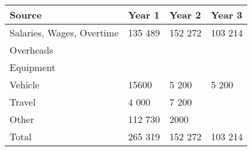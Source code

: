 \documentclass[version=last,
    paper=a4,                               %
    10pt,                                   %
    dvipsnames,
    oneside,                              %
    headings=openany,                       %
    open=any,
    BCOR=7mm,                               %
    DIV=15,     %
]{scrbook}
\begin{document}
\begin{longtabu} to \linewidth { |  X | X | X | X | }
\hline
{}
Source & Year 1 & Year 2 & Year 3\\
\hline
\endhead



Salaries, Wages, Overtime & 135 489 & 152 272 & 103 214\\



Overheads &  &  & \\



Equipment &  &  & \\



Vehicle & 15600 & 5 200 & 5 200\\



Travel & 4 000 & 7 200 & \\



Other & 112 730 & 2000 & \\



Total & 265 319 & 152 272 & 103 214\\


\hline
\end{longtabu}





\end{document}
